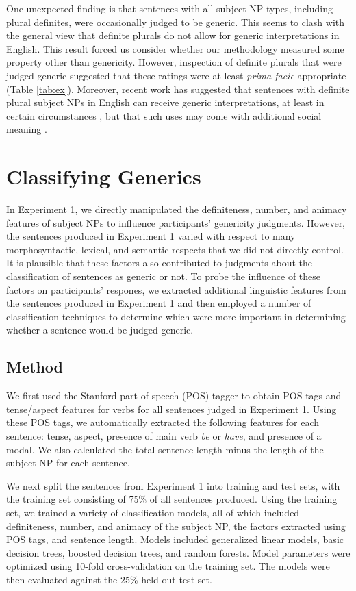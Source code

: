 \documentclass[10pt,letterpaper]{article}
\begin{document}
One unexpected finding is that sentences with all subject NP types, including plural definites, were occasionally judged to be generic. This seems to clash with the general view that definite plurals do not allow for generic interpretations in English. This result forced us consider whether our methodology measured some property other than genericity. However, inspection of definite plurals that were judged generic suggested that these ratings were at least \emph{prima facie} appropriate (Table \ref{tab:ex}). Moreover, recent work has suggested that sentences with definite plural subject NPs in English can receive generic interpretations, at least in certain circumstances \cite{FarkasDeSwart2007}, but that such uses may come with additional social meaning \cite{Acton:2014}.

\section{Classifying Generics}

In Experiment 1, we directly manipulated the definiteness, number, and animacy features of subject NPs to influence participants' genericity judgments. However, the sentences produced in Experiment 1 varied with respect to many morphosyntactic, lexical, and semantic respects that we did not directly control. It is plausible that these factors also contributed to judgments about the classification of sentences as generic or not. To probe the influence of these factors on participants' respones, we extracted additional linguistic features from the sentences produced in Experiment 1 and then employed a number of classification techniques to determine which were more important in determining whether a sentence would be judged generic.

\subsection{Method}

We first used the Stanford part-of-speech (POS) tagger \cite{Toutanova:2003} to obtain POS tags and tense/aspect features for verbs for all sentences judged in Experiment 1. Using these POS tags, we automatically extracted the following features for each sentence: tense, aspect, presence of main verb \textit{be} or \textit{have}, and presence of a modal. We also calculated the total sentence length minus the length of the subject NP for each sentence.

We next split the sentences from Experiment 1 into training and test sets, with the training set consisting of 75\% of all sentences produced. Using the training set, we trained a variety of classification models, all of which included definiteness, number, and animacy of the subject NP, the factors extracted using POS tags, and sentence length. Models included generalized linear models, basic decision trees, boosted decision trees, and random forests. Model parameters were optimized using 10-fold cross-validation on the training set. The models were then evaluated against the 25\% held-out test set.
\end{document}
